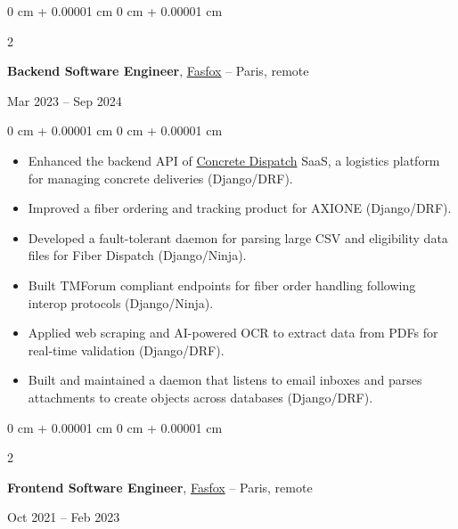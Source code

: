 \documentclass[10pt, letterpaper]{article}
\newenvironment{highlights}{
    \begin{itemize}[
        topsep=0.10 cm,
        parsep=0.10 cm,
        partopsep=0pt,
        itemsep=0pt,
        leftmargin=0 cm + 10pt
    ]
}{
    \end{itemize}
} %
\newenvironment{onecolentry}{
    \begin{adjustwidth}{
        0 cm + 0.00001 cm
    }{
        0 cm + 0.00001 cm
    }
}{
    \end{adjustwidth}
} %
\newenvironment{twocolentry}[2][]{
    \onecolentry
    \def\secondColumn{#2}
    \setcolumnwidth{\fill, 3.5 cm} %
    \begin{paracol}{2}
}{
    \switchcolumn \raggedleft \secondColumn
    \end{paracol}
    \endonecolentry
} %
\let\hrefWithoutArrow\href
\begin{document}
            \begin{twocolentry}{
                Mar 2023 -- Sep 2024
            }
                \textbf{Backend Software Engineer}, \hrefWithoutArrow{https://fasfox.com/}{Fasfox} -- Paris, remote
            \end{twocolentry}

            \vspace{0.10 cm}
            \begin{onecolentry}
                \begin{highlights}
                    
                        \item Enhanced the backend API of \href{https://www.concretedispatch.eu/}{Concrete Dispatch} SaaS, a logistics platform for managing concrete deliveries (Django/DRF).
                    
                        \item Improved a fiber ordering and tracking product for AXIONE (Django/DRF).
                    
                        \item Developed a fault-tolerant daemon for parsing large CSV and eligibility data files for Fiber Dispatch (Django/Ninja).
                    
                        \item Built TMForum compliant endpoints for fiber order handling following interop protocols (Django/Ninja).
                    
                        \item Applied web scraping and AI-powered OCR to extract data from PDFs for real-time validation (Django/DRF).
                    
                        \item Built and maintained a daemon that listens to email inboxes and parses attachments to create objects across databases (Django/DRF).
                    
                \end{highlights}
            \end{onecolentry}
            \vspace{0.2 cm}
        
            \begin{twocolentry}{
                Oct 2021 -- Feb 2023
            }
                \textbf{Frontend Software Engineer}, \hrefWithoutArrow{https://fasfox.com/}{Fasfox} -- Paris, remote
            \end{twocolentry}
\end{document}
